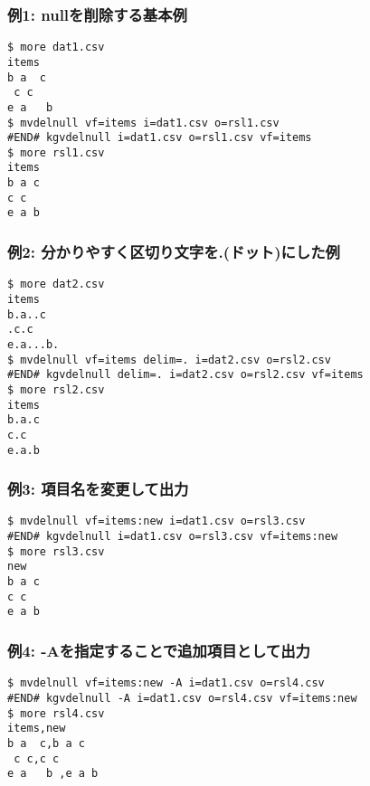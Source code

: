 \subsubsection*{例1: nullを削除する基本例}



\begin{Verbatim}[baselinestretch=0.7,frame=single]
$ more dat1.csv
items
b a  c
 c c
e a   b 
$ mvdelnull vf=items i=dat1.csv o=rsl1.csv
#END# kgvdelnull i=dat1.csv o=rsl1.csv vf=items
$ more rsl1.csv
items
b a c
c c
e a b
\end{Verbatim}
\subsubsection*{例2: 分かりやすく区切り文字を.(ドット)にした例}



\begin{Verbatim}[baselinestretch=0.7,frame=single]
$ more dat2.csv
items
b.a..c
.c.c
e.a...b.
$ mvdelnull vf=items delim=. i=dat2.csv o=rsl2.csv
#END# kgvdelnull delim=. i=dat2.csv o=rsl2.csv vf=items
$ more rsl2.csv
items
b.a.c
c.c
e.a.b
\end{Verbatim}
\subsubsection*{例3: 項目名を変更して出力}



\begin{Verbatim}[baselinestretch=0.7,frame=single]
$ mvdelnull vf=items:new i=dat1.csv o=rsl3.csv
#END# kgvdelnull i=dat1.csv o=rsl3.csv vf=items:new
$ more rsl3.csv
new
b a c
c c
e a b
\end{Verbatim}
\subsubsection*{例4: -Aを指定することで追加項目として出力}



\begin{Verbatim}[baselinestretch=0.7,frame=single]
$ mvdelnull vf=items:new -A i=dat1.csv o=rsl4.csv
#END# kgvdelnull -A i=dat1.csv o=rsl4.csv vf=items:new
$ more rsl4.csv
items,new
b a  c,b a c
 c c,c c
e a   b ,e a b
\end{Verbatim}
